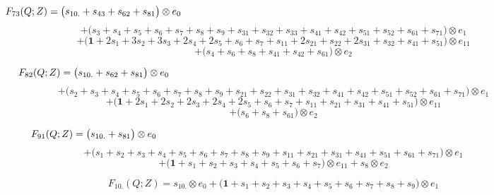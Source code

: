 \documentclass[12pt]{amsart}
\theoremstyle{plain}
\theoremstyle{definition}
\theoremstyle{remark}
\begin{document}
$$F_{ 73 }(Q;Z)=
\big( s_{10.} + s_{43} + s_{62} + s_{81} \big) \otimes e_{ 0 }  \hskip 5in \  $$ $$
+\big( s_{3} + s_{4} + s_{5} + s_{6} + s_{7} + s_{8} + s_{9} + s_{31} + s_{32} + s_{33} + s_{41} + s_{42} + s_{51} + s_{52} + s_{61} + s_{71} \big) \otimes e_{ 1 } $$ $$
+\big( \boldsymbol{1} + 2 s_{1} + 3 s_{2} + 3 s_{3} + 2 s_{4} + 2 s_{5} + s_{6} + s_{7} + s_{11} + 2 s_{21} + s_{22} + 2 s_{31} + s_{32} + s_{41} + s_{51} \big) \otimes e_{ 11 } $$ $$
+\big( s_{4} + s_{6} + s_{8} + s_{41} + s_{42} + s_{61} \big) \otimes e_{ 2 }
$$

\vfill\eject
$$F_{ 82 }(Q;Z)=
\big( s_{10.} + s_{62} + s_{81} \big) \otimes e_{ 0 }  \hskip 5in \  $$ $$
+\big( s_{2} + s_{3} + s_{4} + s_{5} + s_{6} + s_{7} + s_{8} + s_{9} + s_{21} + s_{22} + s_{31} + s_{32} + s_{41} + s_{42} + s_{51} + s_{52} + s_{61} + s_{71} \big) \otimes e_{ 1 } $$ $$
+\big( \boldsymbol{1} + 2 s_{1} + 2 s_{2} + 2 s_{3} + 2 s_{4} + 2 s_{5} + s_{6} + s_{7} + s_{11} + s_{21} + s_{31} + s_{41} + s_{51} \big) \otimes e_{ 11 } $$ $$
+\big( s_{6} + s_{8} + s_{61} \big) \otimes e_{ 2 }
$$

$$F_{ 91 }(Q;Z)=
\big( s_{10.} + s_{81} \big) \otimes e_{ 0 } \hskip 5in \  $$ $$
+\big( s_{1} + s_{2} + s_{3} + s_{4} + s_{5} + s_{6} + s_{7} + s_{8} + s_{9} + s_{11} + s_{21} + s_{31} + s_{41} + s_{51} + s_{61} + s_{71} \big) \otimes e_{ 1 } $$ $$
+\big( \boldsymbol{1} + s_{1} + s_{2} + s_{3} + s_{4} + s_{5} + s_{6} + s_{7} \big) \otimes e_{ 11 }
+ s_{8} \otimes e_{ 2 }
$$

$$F_{ 10. }(Q;Z)=
s_{10.} \otimes e_{ 0 }
+\big( \boldsymbol{1} + s_{1} + s_{2} + s_{3} + s_{4} + s_{5} + s_{6} + s_{7} + s_{8} + s_{9} \big) \otimes e_{ 1 }
$$
\end{document}
